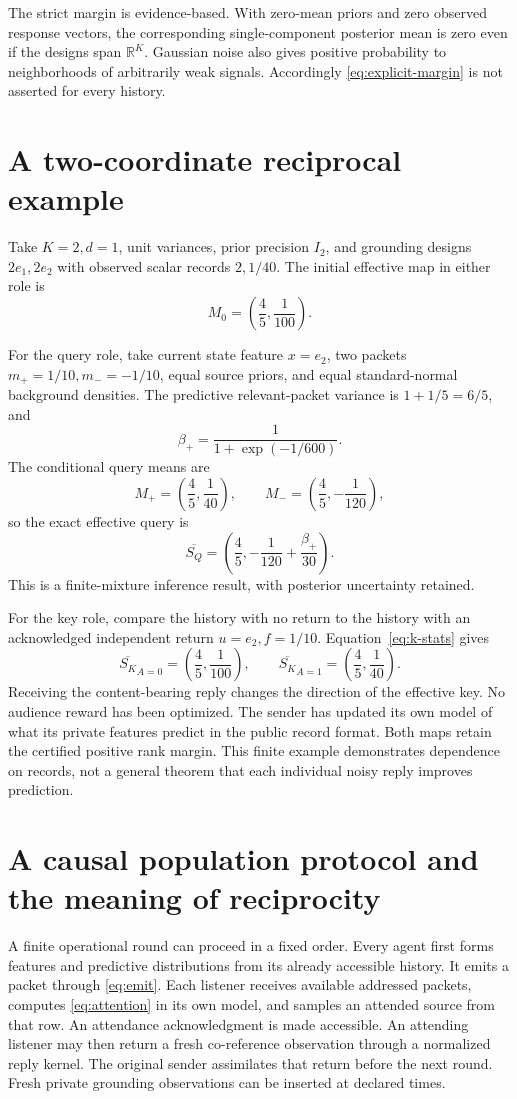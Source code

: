 \documentclass[11pt]{article}
\theoremstyle{definition}
\theoremstyle{remark}
\newcommand{\R}{\mathbb R}
\newcommand{\SQ}{S_{Q}}
\newcommand{\SK}{S_{K}}
\begin{document}
The strict margin is evidence-based. With zero-mean priors and zero observed response vectors, the corresponding single-component posterior mean is zero even if the designs span \(\R^K\). Gaussian noise also gives positive probability to neighborhoods of arbitrarily weak signals. Accordingly \eqref{eq:explicit-margin} is not asserted for every history.

\section{A two-coordinate reciprocal example}

Take \(K=2,d=1\), unit variances, prior precision \(I_2\), and grounding designs \(2e_1,2e_2\) with observed scalar records \(2,1/40\). The initial effective map in either role is
\[
M_0=\left(\frac45,\frac1{100}\right).
\]

For the query role, take current state feature \(x=e_2\), two packets \(m_+=1/10,m_-=-1/10\), equal source priors, and equal standard-normal background densities. The predictive relevant-packet variance is \(1+1/5=6/5\), and
\[
\beta_+=\frac{1}{1+\exp(-1/600)}.
\]
The conditional query means are
\[
M_+=\left(\frac45,\frac1{40}\right),
\qquad
M_-=\left(\frac45,-\frac1{120}\right),
\]
so the exact effective query is
\[
\overline{\SQ}
=
\left(\frac45,-\frac1{120}+\frac{\beta_+}{30}\right).
\]
This is a finite-mixture inference result, with posterior uncertainty retained.

For the key role, compare the history with no return to the history with an acknowledged independent return \(u=e_2,f=1/10\). Equation~\eqref{eq:k-stats} gives
\[
\overline{\SK}_{A=0}
=
\left(\frac45,\frac1{100}\right),
\qquad
\overline{\SK}_{A=1}
=
\left(\frac45,\frac1{40}\right).
\]
Receiving the content-bearing reply changes the direction of the effective key. No audience reward has been optimized. The sender has updated its own model of what its private features predict in the public record format. Both maps retain the certified positive rank margin. This finite example demonstrates dependence on records, not a general theorem that each individual noisy reply improves prediction.

\section{A causal population protocol and the meaning of reciprocity}

A finite operational round can proceed in a fixed order. Every agent first forms features and predictive distributions from its already accessible history. It emits a packet through \eqref{eq:emit}. Each listener receives available addressed packets, computes \eqref{eq:attention} in its own model, and samples an attended source from that row. An attendance acknowledgment is made accessible. An attending listener may then return a fresh co-reference observation through a normalized reply kernel. The original sender assimilates that return before the next round. Fresh private grounding observations can be inserted at declared times.
\end{document}

